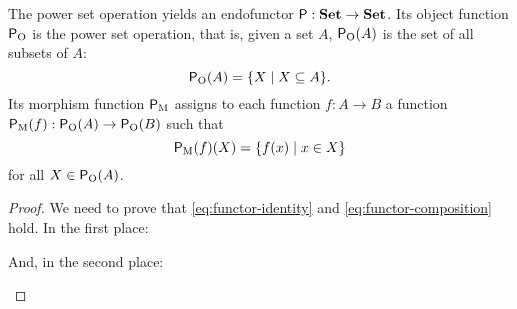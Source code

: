 \begin{example}
  \label{ex:functor-power-set}


  The power set operation yields an endofunctor $\mathsf{P}: \mathbf{Set} \to
  \mathbf{Set}$. Its object function $\mathsf{P}_{\operatorname{O}}$ is the power set operation,
  that is, given a set $A$, $\mathsf{P}_{\operatorname{O}}(A)$ is the set of all subsets
  of $A$:
  \begin{equation}
    \label{eq:functor-power-set-object}
    \mathsf{P}_{\operatorname{O}}(A) = \{X \mid X \subseteq A\}
    \text{.}
  \end{equation}
  Its morphism function $\mathsf{P}_{\operatorname{M}}$ assigns to each function $f: A \to
  B$ a function $\mathsf{P}_{\operatorname{M}}(f): \mathsf{P}_{\operatorname{O}}(A) \to \mathsf{P}_{\operatorname{O}}(B)$ such
  that
  \begin{equation}
    \label{eq:functor-power-set-morphism}
    \mathsf{P}_{\operatorname{M}}(f)(X) = \{f(x) \mid x \in X\}
  \end{equation}
  for all $X \in \mathsf{P}_{\operatorname{O}}(A)$.

  \begin{proof}

    We need to prove that \eqref{eq:functor-identity} and
    \eqref{eq:functor-composition} hold. In the first place:
    \begin{steps}
        \eqby{\eqref{eq:set-identity}}
        \eqbynothing
    \end{steps}
    And, in the second place:
    \begin{steps}
        \eqby{\eqref{eq:set-composition}}
        \eqby{\eqref{eq:functor-power-set-morphism}}
    \end{steps}

  \end{proof}

\end{example}

